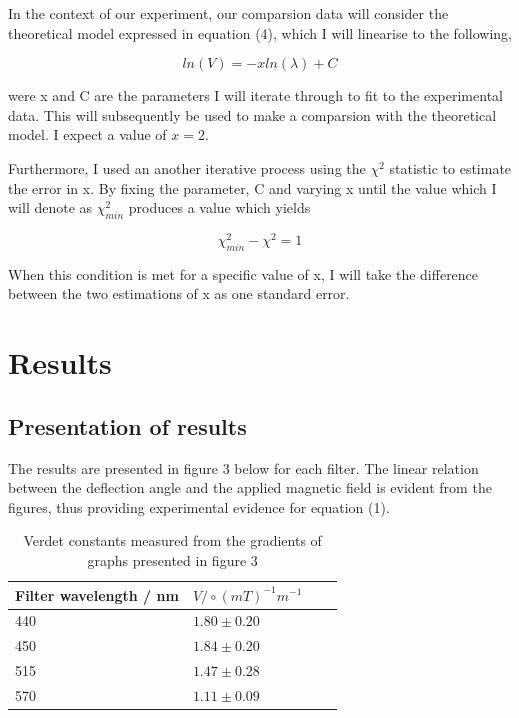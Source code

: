 \documentclass{article}%
\begin{document}
In the context of our experiment, our comparsion data will consider the theoretical model expressed in equation (4), which I will linearise to the following,

\begin{equation}
    ln(V) = -xln(\lambda) + C
 \end{equation}


were x and C are the parameters I will iterate through to fit to the experimental data. This will subsequently be used to make a comparsion with the theoretical model. I expect a value of $x=2$.

Furthermore, I used an another iterative process using the $\chi^{2}$ statistic to estimate the error in x. By fixing the parameter, C and varying x until the value which I will denote as $\chi^{2}_{min}$ produces a value which yields

\begin{equation}
    \chi^{2}_{min} - \chi^{2} = 1
\end{equation} 

When this condition is met for a specific value of x, I will take the difference between the two estimations of x as one standard error. \cite{HH}

\section{Results}
\subsection{Presentation of results}
The results are presented in figure 3 below for each filter. The linear relation between the deflection angle and the applied magnetic field is evident from the figures, thus providing experimental evidence for equation (1).


\begin{table}[H]
    \begin{centering}
    \begin{tabular}{|p{3cm}||p{3cm}|p{3cm}|p{3cm}|} 
        \hline
        Filter wavelength / nm & $V/ \circ(mT)^{-1}m^{-1}$ \\ [0.75ex] 
        \hline\hline
        \hline
        440 & $1.80 \pm 0.20$ \\
        \hline
        450 & $1.84 \pm 0.20$ \\
        \hline
        515 & $1.47 \pm 0.28$  \\ 
        \hline
        570 & $1.11 \pm 0.09$  \\ 
        \hline
    \end{tabular}
    \caption{Verdet constants measured from the gradients of graphs presented in figure 3 }
\end{centering}
\end{table}
\end{document}
